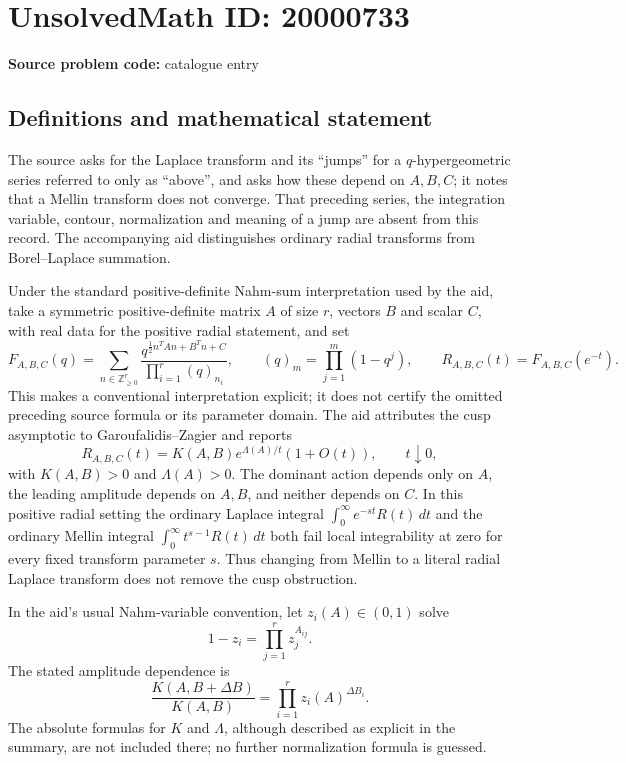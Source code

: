 \documentclass[11pt]{article}
\newcommand{\Z}{\mathbb{Z}}
\begin{document}
\section*{UnsolvedMath ID: 20000733}
\textbf{Source problem code:} catalogue entry
\subsection{Definitions and mathematical statement}
The source asks for the Laplace transform and its ``jumps'' for a $q$-hypergeometric series referred to only as ``above'', and asks how these depend on $A,B,C$; it notes that a Mellin transform does not converge. That preceding series, the integration variable, contour, normalization and meaning of a jump are absent from this record. The accompanying aid distinguishes ordinary radial transforms from Borel--Laplace summation.

Under the standard positive-definite Nahm-sum interpretation used by the aid, take a symmetric positive-definite matrix $A$ of size $r$, vectors $B$ and scalar $C$, with real data for the positive radial statement, and set
\[
 F_{A,B,C}(q)=\sum_{n\in\Z_{\geq0}^r}
 \frac{q^{\frac12 n^TAn+B^Tn+C}}{\prod_{i=1}^r(q)_{n_i}},
 \qquad(q)_m=\prod_{j=1}^m(1-q^j),\qquad R_{A,B,C}(t)=F_{A,B,C}(e^{-t}).
\]
This makes a conventional interpretation explicit; it does not certify the omitted preceding source formula or its parameter domain. The aid attributes the cusp asymptotic to Garoufalidis--Zagier and reports
\[
 R_{A,B,C}(t)=K(A,B)e^{\Lambda(A)/t}(1+O(t)),\qquad t\downarrow0,
\]
with $K(A,B)>0$ and $\Lambda(A)>0$. The dominant action depends only on $A$, the leading amplitude depends on $A,B$, and neither depends on $C$. In this positive radial setting the ordinary Laplace integral $\int_0^\infty e^{-st}R(t)\,dt$ and the ordinary Mellin integral $\int_0^\infty t^{s-1}R(t)\,dt$ both fail local integrability at zero for every fixed transform parameter $s$. Thus changing from Mellin to a literal radial Laplace transform does not remove the cusp obstruction.

In the aid's usual Nahm-variable convention, let $z_i(A)\in(0,1)$ solve
\[
 1-z_i=\prod_{j=1}^r z_j^{A_{ij}}.
\]
The stated amplitude dependence is
\[
 \frac{K(A,B+\Delta B)}{K(A,B)}=\prod_{i=1}^r z_i(A)^{\Delta B_i}.
\]
The absolute formulas for $K$ and $\Lambda$, although described as explicit in the summary, are not included there; no further normalization formula is guessed.
\end{document}
